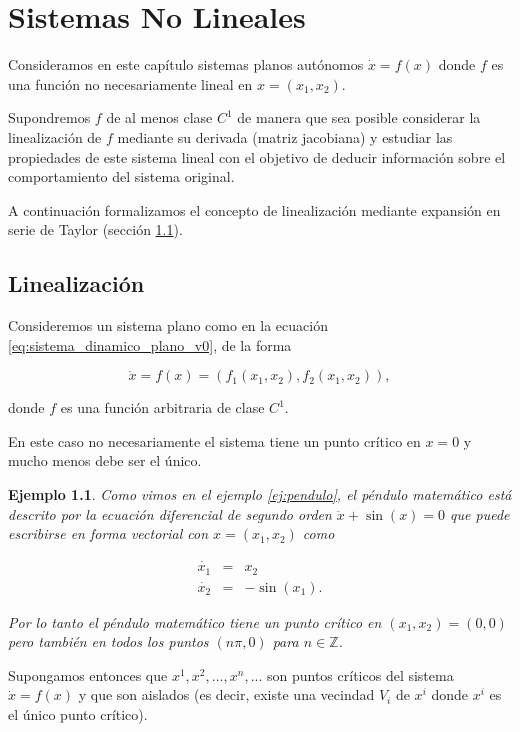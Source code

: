 \documentclass[11pt]{book}
\theoremstyle{definition}
\numberwithin{definition}{section}
\theoremstyle{theorem}
\numberwithin{theorem}{section}
\numberwithin{lemma}{section}
\numberwithin{corollary}{section}
\theoremstyle{plain}
\newtheorem{example}{Ejemplo}
\numberwithin{example}{section}
\newcommand{\Z}{{\ensuremath{\mathbb{Z}}}}
\begin{document}
\chapter{Sistemas No Lineales}
Consideramos en este capítulo sistemas planos autónomos $\dot{x} = f(x)$ donde $f$ es una función no necesariamente lineal en $x = (x_1,x_2)$.

Supondremos $f$ de al menos clase $C^1$ de manera que sea posible considerar la linealización de $f$ mediante su derivada (matriz jacobiana) y estudiar las propiedades de este sistema lineal con el objetivo de deducir información sobre el comportamiento del sistema original.

A continuación formalizamos el concepto de linealización mediante expansión en serie de Taylor (sección \ref{sec:linealizacion}).

\section{Linealización} \label{sec:linealizacion}

Consideremos un sistema plano como en la ecuación \ref{eq:sistema_dinamico_plano_v0}, de la forma

\begin{equation}
	\dot{x} = f(x) = (f_1(x_1,x_2), f_2(x_1,x_2)),
\end{equation}

donde $f$ es una función arbitraria de clase $C^1$.

En este caso no necesariamente el sistema tiene un punto crítico en $x = 0$ y mucho menos debe ser el único.

\begin{example}Como vimos en el ejemplo \ref{ej:pendulo}, el péndulo matemático está descrito por la ecuación diferencial de segundo orden $\ddot{x} + \sin(x) = 0$ que puede escribirse en forma vectorial con $x = (x_1,x_2)$ como

$$
\begin{array}{lll}
	\dot{x_1} & = & x_2 \\
	\dot{x_2} & = & -\sin(x_1).
\end{array}
$$

Por lo tanto el péndulo matemático tiene un punto crítico en $(x_1,x_2) = (0,0)$ pero también en todos los puntos $(n\pi, 0)$ para $n \in \Z$.
\end{example}

Supongamos entonces que $x^1, x^2, ..., x^n, ...$ son puntos críticos del sistema $\dot{x} = f(x)$ y que son aislados (es decir, existe una vecindad  $V_i$ de $x^i$ donde $x^i$ es el único punto crítico).
\end{document}
